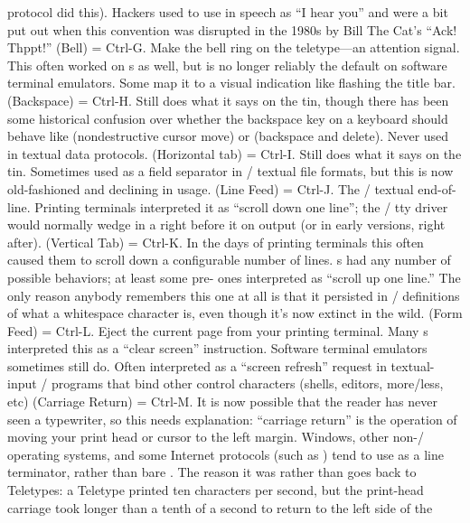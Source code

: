 protocol did this). Hackers used to use  in speech as ``I hear you'' and
were a bit put out when this convention was disrupted in the 1980s by Bill The
Cat's ``Ack! Thppt!''
\dlist {} (Bell) = Ctrl-G.
Make the bell ring on the teletype---an attention signal. This often worked on
s as well, but is no longer reliably the default on software terminal
emulators. Some map it to a visual indication like flashing the title bar.
\dlist {} (Backspace) = Ctrl-H.
Still does what it says on the tin, though there has been some historical
confusion over whether the backspace key on a keyboard should behave like 
(nondestructive cursor move) or  (backspace and delete). Never used in
textual data protocols.
\dlist {} (Horizontal tab) = Ctrl-I.
Still does what it says on the tin. Sometimes used as a field separator in \UNIX/
textual file formats, but this is now old-fashioned and declining in usage.
\dlist {} (Line Feed) = Ctrl-J.
The \UNIX/ textual end-of-line. Printing terminals interpreted it as ``scroll down
one line''; the \UNIX/ tty driver would normally wedge in a  right before it on
output (or in early versions, right after).
\dlist {} (Vertical Tab) = Ctrl-K.
In the days of printing terminals this often caused them to scroll down a
configurable number of lines. s had any number of possible behaviors; at
least some pre- ones interpreted  as ``scroll up one line.'' The only
reason anybody remembers this one at all is that it persisted in \UNIX/
definitions of what a whitespace character is, even though it's now extinct in
the wild.
\dlist {} (Form Feed) = Ctrl-L. Eject the current page from your printing
terminal. Many s interpreted this as a ``clear screen'' instruction. Software
terminal emulators sometimes still do. Often interpreted as a ``screen refresh''
request in textual-input \UNIX/ programs that bind other control characters
(shells, editors, more/less, etc)
\dlist {} (Carriage Return) = Ctrl-M.
It is now possible that the reader has never seen a typewriter, so this needs
explanation: ``carriage return'' is the operation of moving your print head or
cursor to the left margin. Windows, other non-\UNIX/ operating systems, and some
Internet protocols (such as ) tend to use  as a line terminator,
rather than bare . The reason it was  rather than  goes back to
Teletypes: a Teletype printed ten characters per second, but the print-head
carriage took longer than a tenth of a second to return to the left side of the

